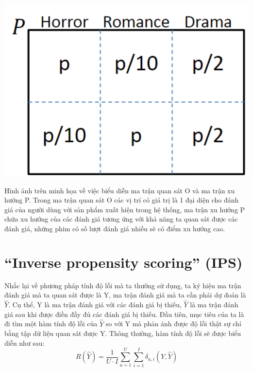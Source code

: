 \includegraphics[width=\textwidth]{images/Chapter3/P.png}


Hình ảnh trên minh họa về việc biểu diễn ma trận quan sát O và ma trận xu hướng P. Trong ma trận quan sát O các vị trí có giá trị là 1 đại diện cho đánh giá của người dùng với sản phẩm xuất hiện trong hệ thống, ma trận xu hướng P chứa xu hướng của các đánh giá tương ứng với khả năng ta quan sát được các đánh giá, những phim có số lượt đánh giá nhiều sẽ có điểm xu hướng cao.

\section{``Inverse propensity scoring'' (IPS)}

Nhắc lại về phương pháp tính độ lỗi mà ta thường sử dụng, ta  ký hiệu ma trận đánh giá mà ta quan sát được là Y, ma trận đánh giá mà ta cần phải dự đoán là $\hat{Y}$. Cụ thể, Y là ma trận đánh giá với các đánh giá bị thiếu, $\hat{Y}$ là ma trận đánh giá sau khi được điền đầy đủ các đánh giá bị thiếu. Đầu tiên, mục tiêu của ta là đi tìm một hàm tính độ lỗi của $\hat{Y}$ so với Y mà phản ánh được độ lỗi thật sự chỉ bằng tập dữ liệu quan sát được Y. Thông thường, hàm tính độ lỗi sẽ được biểu diễn như sau:
\begin{equation}
\label{eq:tradition}
R(\hat{Y}) = \frac{1}{U\cdot I}  \sum_{u=1}^{U} \sum_{i=1}^{I} \delta_{u,i}(Y,\hat{Y})
\end{equation}

